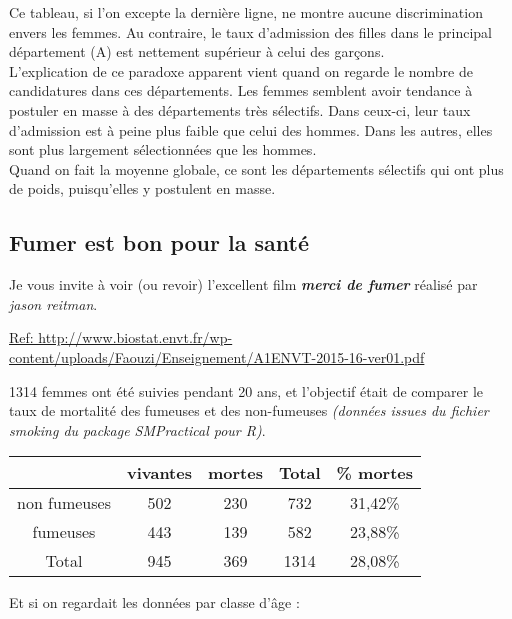 \documentclass[10pt,dvipsnames, dvips, svgnames]{article}
\begin{document}
Ce tableau, si l'on excepte la dernière ligne, ne montre aucune discrimination envers les femmes. Au contraire, le taux d'admission des filles dans le principal département (A) est nettement supérieur à celui des garçons.\\
L'explication de ce paradoxe apparent vient quand on regarde le nombre de candidatures dans ces départements. Les femmes semblent avoir tendance à postuler en masse à des départements très sélectifs. Dans ceux-ci, leur taux d'admission est à peine plus faible que celui des hommes. Dans les autres, elles sont plus largement sélectionnées que les hommes.\\
Quand on fait la moyenne globale, ce sont les départements sélectifs qui ont plus de poids, puisqu'elles y postulent en masse.

\subsection{Fumer est bon pour la santé}

Je vous invite à voir (ou revoir) l'excellent  film  \textit{\textbf{merci de fumer}}  réalisé par \textit{jason reitman}.
\medskip

\href{http://www.biostat.envt.fr/wp-content/uploads/Faouzi/Enseignement/A1ENVT-2015-16-ver01.pdf}{Ref: http://www.biostat.envt.fr/wp-content/uploads/Faouzi/Enseignement/A1ENVT-2015-16-ver01.pdf}




1314 femmes ont été suivies pendant 20 ans, et l'objectif était de comparer le taux de mortalité des fumeuses et des non-fumeuses  \textit{(données issues du fichier smoking du package SMPractical pour R)}.

\begin{center}
\begin{tabular}[]{|c |c |c |c | c |}
\hline & vivantes & mortes & Total & \% mortes \\
\hline \hline  non  fumeuses & 502 & 230 & 732 & 31,42\% \\
\hline fumeuses & 443 & 139 & 582 & 23,88\% \\
\hline Total & 945 & 369 & 1314 & 28,08\% \\
\hline 
\end{tabular} 
\end{center}

Et si on regardait les données par classe d'âge :


\end{document}
